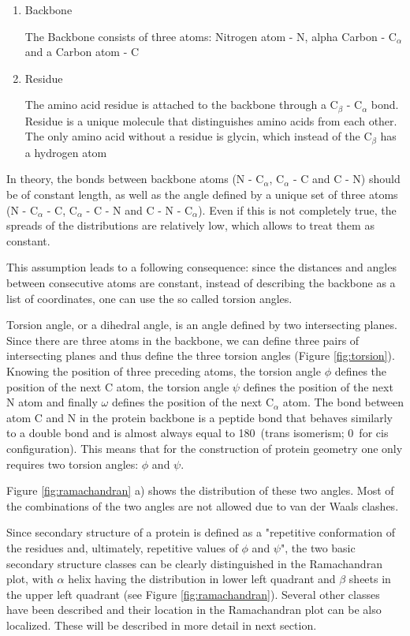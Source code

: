 \begin{enumerate}
    \item Backbone
    
        The Backbone consists of three atoms: Nitrogen atom - N, alpha Carbon - C$_\alpha$ and a Carbon atom - C
    \item Residue
        
        The amino acid residue is attached to the backbone through a C$_\beta$ - C$_\alpha$ bond. Residue is a unique molecule that distinguishes amino acids from each other. The only amino acid without a residue is glycin, which instead of the C$_\beta$ has a hydrogen atom  
\end{enumerate}

In theory, the bonds between backbone atoms (N - C$_\alpha$, C$_\alpha$ - C and C - N) should be of constant length, as well as the angle defined by a unique set of three atoms (N - C$_\alpha$ - C, C$_\alpha$ - C - N and C - N - C$_\alpha$). Even if this is not completely true, the spreads of the distributions are relatively low, which allows to treat them as constant.

This assumption leads to a following consequence: since the distances and angles between consecutive atoms are constant, instead of describing the backbone as a list of coordinates, one can use the so called torsion angles.

Torsion angle, or a dihedral angle, is an angle defined by two intersecting planes. Since there are three atoms in the backbone, we can define three pairs of intersecting planes and thus define the three torsion angles (Figure \ref{fig:torsion}). Knowing the position of three preceding atoms, the torsion angle $\phi$ defines the position of the next C atom, the torsion angle $\psi$ defines the position of the next N atom and finally $\omega$ defines the position of the next C$_\alpha$ atom. The bond between atom C and N in the protein backbone is a peptide bond that behaves similarly to a double bond and is almost always equal to 180\degree~(trans isomerism; 0\degree~for cis configuration). This means that for the construction of protein geometry one only requires two torsion angles: $\phi$ and $\psi$.

Figure \ref{fig:ramachandran} a) shows the distribution of these two angles. Most of the combinations of the two angles are not allowed due to van der Waals clashes. 

Since secondary structure of a protein is defined as a "repetitive conformation of the residues and, ultimately, repetitive values of $\phi$ and $\psi$", the two basic secondary structure classes can be clearly distinguished in the Ramachandran plot, with $\alpha$ helix having the distribution in lower left quadrant and $\beta$ sheets in the upper left quadrant (see Figure \ref{fig:ramachandran}). Several other classes have been described and their location in the Ramachandran plot can be also localized. These will be described in more detail in next section. 

